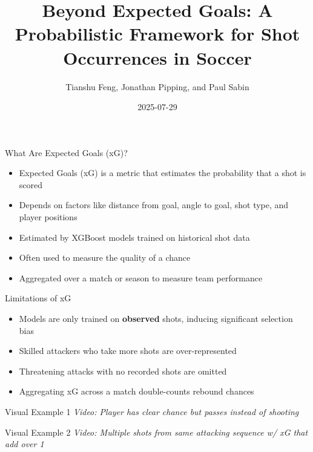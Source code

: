 \documentclass[
  11pt,
  ignorenonframetext,
]{beamer}
\title[Beyond Expected Goals]{Beyond Expected Goals: A Probabilistic
Framework for Shot Occurrences in Soccer}
\author[Feng, T., Pipping, J., \& Sabin, P.]{Tianshu Feng, Jonathan
Pipping, and Paul Sabin}
\date{2025-07-29}
\institute[UPenn]{University of Pennsylvania}
\providecommand{\tightlist}{%
  \setlength{\itemsep}{0pt}\setlength{\parskip}{0pt}}
\begin{document}
\frame{\titlepage}

\begin{frame}{What Are Expected Goals (xG)?}
\protect{}\label{what-are-expected-goals-xg}
\begin{itemize}
\tightlist
\item
  Expected Goals (xG) is a metric that estimates the probability that a
  shot is scored
\item
  Depends on factors like distance from goal, angle to goal, shot type,
  and player positions
\item
  Estimated by XGBoost models trained on historical shot data
\item
  Often used to measure the quality of a chance
\item
  Aggregated over a match or season to measure team performance
\end{itemize}
\end{frame}

\begin{frame}{Limitations of xG}
\protect{}\label{limitations-of-xg}
\begin{itemize}
\tightlist
\item
  Models are only trained on \textbf{observed} shots, inducing
  significant selection bias
\item
  Skilled attackers who take more shots are over-represented
\item
  Threatening attacks with no recorded shots are omitted
\item
  Aggregating xG across a match double-counts rebound chances
\end{itemize}
\end{frame}

\begin{frame}{Visual Example 1}
\protect{}\label{visual-example-1}
\emph{Video: Player has clear chance but passes instead of shooting}
\end{frame}

\begin{frame}{Visual Example 2}
\protect{}\label{visual-example-2}
\emph{Video: Multiple shots from same attacking sequence w/ xG that add
over 1}
\end{frame}
\end{document}
